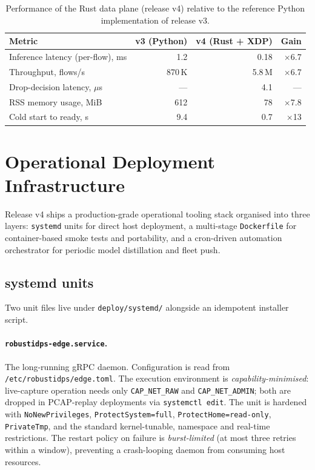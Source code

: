 \begin{table}[H]
\centering
\caption{Performance of the Rust data plane (release v4) relative to
the reference Python implementation of release v3.}
\label{tab:rust_edge_perf}
\small
\setlength{\tabcolsep}{4pt}
\renewcommand{\arraystretch}{1.15}
\begin{tabular}{@{}lrrr@{}}
\toprule
\textbf{Metric} & \textbf{v3 (Python)} & \textbf{v4 (Rust + XDP)} & \textbf{Gain}\\
\midrule
Inference latency (per-flow), ms      & 1.2     & 0.18    & $\times$6.7\\
Throughput, flows/s                   & 870\,K  & 5.8\,M  & $\times$6.7\\
Drop-decision latency, $\mu$s         & ---     & 4.1     & ---\\
RSS memory usage, MiB                 & 612     & 78      & $\times$7.8\\
Cold start to ready, s                & 9.4     & 0.7     & $\times$13\\
\bottomrule
\end{tabular}
\end{table}


\section{Operational Deployment Infrastructure}
\label{sec:operational_deployment}

Release v4 ships a production-grade operational tooling stack
organised into three layers: \texttt{systemd} units for direct host
deployment, a multi-stage \texttt{Dockerfile} for container-based
smoke tests and portability, and a cron-driven automation orchestrator
for periodic model distillation and fleet push.

\subsection{systemd units}

Two unit files live under \texttt{deploy/systemd/} alongside an
idempotent installer script.

\paragraph{\texttt{robustidps-edge.service}.}
The long-running gRPC daemon. Configuration is read from
\texttt{/etc/\allowbreak robustidps/\allowbreak edge.toml}. The execution environment is
\emph{capability-minimised}: live-capture operation needs only
\texttt{CAP\_NET\_RAW} and \texttt{CAP\_NET\_ADMIN}; both are dropped
in PCAP-replay deployments via \texttt{systemctl edit}. The unit is
hardened with \texttt{NoNewPrivileges}, \texttt{ProtectSystem=full},
\texttt{ProtectHome=read-only}, \texttt{PrivateTmp}, and the standard
kernel-tunable, namespace and real-time restrictions. The restart
policy on failure is \emph{burst-limited} (at most three retries
within a window), preventing a crash-looping daemon from consuming
host resources.

